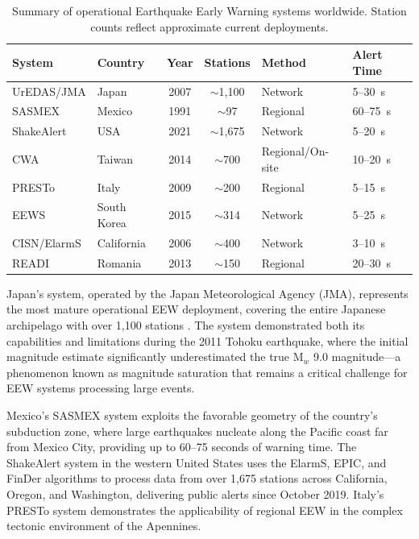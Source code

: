 \documentclass[review,authoryear]{elsarticle}
\begin{document}
\begin{table}[htbp]
\centering
\caption{Summary of operational Earthquake Early Warning systems worldwide. Station counts reflect approximate current deployments.}
\label{tab:eew_systems}
\small
\begin{tabular}{llccll}
\toprule
\textbf{System} & \textbf{Country} & \textbf{Year} & \textbf{Stations} & \textbf{Method} & \textbf{Alert Time} \\
\midrule
UrEDAS/JMA & Japan & 2007 & $\sim$1,100 & Network & 5--30~s \\
SASMEX & Mexico & 1991 & $\sim$97 & Regional & 60--75~s \\
ShakeAlert & USA & 2021 & $\sim$1,675 & Network & 5--20~s \\
CWA & Taiwan & 2014 & $\sim$700 & Regional/On-site & 10--20~s \\
PRESTo & Italy & 2009 & $\sim$200 & Regional & 5--15~s \\
EEWS & South Korea & 2015 & $\sim$314 & Network & 5--25~s \\
CISN/ElarmS & California & 2006 & $\sim$400 & Network & 3--10~s \\
READI & Romania & 2013 & $\sim$150 & Regional & 20--30~s \\
\bottomrule
\end{tabular}
\end{table}

Japan's system, operated by the Japan Meteorological Agency (JMA), represents the most mature operational EEW deployment, covering the entire Japanese archipelago with over 1,100 stations \citep{hoshiba2015earthquake}. The system demonstrated both its capabilities and limitations during the 2011 Tohoku earthquake, where the initial magnitude estimate significantly underestimated the true M$_w$ 9.0 magnitude---a phenomenon known as magnitude saturation that remains a critical challenge for EEW systems processing large events.

Mexico's SASMEX system \citep{espinosa1995mexico} exploits the favorable geometry of the country's subduction zone, where large earthquakes nucleate along the Pacific coast far from Mexico City, providing up to 60--75 seconds of warning time. The ShakeAlert system in the western United States \citep{given2018shakealert} uses the ElarmS, EPIC, and FinDer algorithms to process data from over 1,675 stations across California, Oregon, and Washington, delivering public alerts since October 2019. Italy's PRESTo system \citep{zollo2014earthquake} demonstrates the applicability of regional EEW in the complex tectonic environment of the Apennines.
\end{document}
